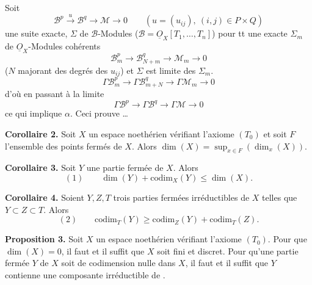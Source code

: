 \documentclass[11pt,a4paper]{article}
\begin{document}
Soit
\[
\mathcal{B}^{p} \xrightarrow{u} \mathcal{B}^{q} \to \mathcal{M} \to 0
\qquad (u = (u_{ij}),\ (i, j) \in P \times Q)
\]
une suite exacte, $\Sigma$ \struck{\ill{} \ill{}} de $\mathcal{B}$-Modules
($\mathcal{B} = \underline{O}_{X}[T_{1}, \ldots, T_{n}]$) \ill{} \ill{} pour tt
\ill{} une  exacte $\Sigma_{m}$ de $\underline{O}_{X}$-Modules
cohérents
\[
\mathcal{B}_{m}^{p} \to \mathcal{B}_{N+m}^{q} \to \mathcal{M}_{m} \to 0
\]
($N$ majorant des degrés des $u_{ij}$) \struck{\ill{}} et $\Sigma$ est limite
des $\Sigma_{m}$. 
\[
\Gamma\mathcal{B}_{m}^{p} \to \Gamma\mathcal{B}_{m+N}^{q} \to \Gamma\mathcal{M}_{m} \to 0
\]
d'où en passant à la limite
\[
\Gamma\mathcal{B}^{p} \to \Gamma\mathcal{B}^{q} \to \Gamma\mathcal{M} \to 0
\]
ce qui implique $\alpha$. \struck{\ill{}} Ceci prouve \ldots{}



\textbf{Corollaire 2.} Soit $X$ un espace noethérien vérifiant l'axiome
$(T_{0})$ et soit $F$ l'ensemble des points fermés de $X$. Alors $\dim(X) =
\sup_{x \in F}(\dim_{x}(X))$.

\textbf{Corollaire 3.} Soit $Y$ une partie fermée de $X$. Alors
\[
(1) \qquad \dim(Y) + \mathrm{codim}_{X}(Y) \leq \dim(X).
\]

\textbf{Corollaire 4.} Soient $Y, Z, T$ trois parties fermées irréductibles de
$X$ telles que $Y \subset Z \subset T$. Alors
\[
(2) \qquad \mathrm{codim}_{T}(Y) \geq \mathrm{codim}_{Z}(Y) +
\mathrm{codim}_{T}(Z).
\]

\textbf{Proposition 3.} Soit $X$ un espace noethérien vérifiant l'axiome
$(T_{0})$. Pour que $\dim(X) = 0$, il faut et il suffit que $X$ soit fini et
discret. Pour qu'une partie fermée $Y$ de $X$ soit de codimension nulle dans
$X$, il faut et il suffit que $Y$ contienne une composante irréductible de
.
\end{document}
